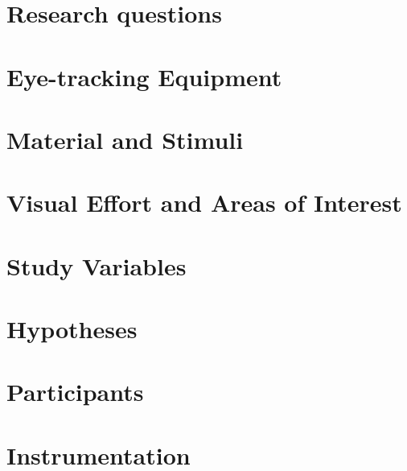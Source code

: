 \iffalse
\begin{itemize}
	\item How to measure simplicity and scalability
	\item Not just what you did but why and what the consequences are
\end{itemize}
Explore design space, motivate method, consequences, 
\fi

\section{Research questions}

\iffalse
In the original test process subjects were instructed to observe an identifier on a screen, which was then replaced with another four identifiers. One of them matched the previous identifier, whereas the rest of them were incorrect, meant of distract the subject. The data that was then measured is the accuracy of the subject to identify the correct word, as well as the time it took to reach an answer. From the tobii eye tracker additional data such as time spent on each word, amount of fixations vs saccades (eye flicker), can be extracted.
Furthermore, data such as subject age, experience and background will be extracted in an interview like setting.
\fi

\section{Eye-tracking Equipment}

\section{Material and Stimuli}

\section{Visual Effort and Areas of Interest}

\section{Study Variables}

\section{Hypotheses}

\section{Participants}

\section{Instrumentation}